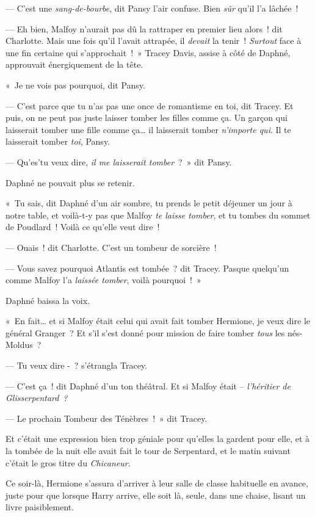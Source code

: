 --- C'est une \emph{sang-de-bourbe}, dit Pansy l'air confuse. Bien \emph{sûr} qu'il l'a lâchée~!

--- Eh bien, Malfoy n'aurait pas dû la rattraper en premier lieu alors~! dit Charlotte. Mais une fois qu'il l'avait attrapée, il \emph{devait} la tenir~! \emph{Surtout} face à une fin certaine qui s'approchait~!~» Tracey Davis, assise à côté de Daphné, approuvait énergiquement de la tête.

«~Je ne vois pas pourquoi, dit Pansy.

--- C'est parce que tu n'as pas une once de romantisme en toi, dit Tracey. Et puis, on ne peut pas juste laisser tomber les filles comme ça. Un garçon qui laisserait tomber une fille comme ça… il laisserait tomber \emph{n'importe qui}. Il te laisserait tomber \emph{toi}, Pansy.

--- Qu'es'tu veux dire, \emph{il me laisserait tomber}~?~» dit Pansy.

Daphné ne pouvait plus se retenir.

«~Tu sais, dit Daphné d'un air sombre, tu prends le petit déjeuner un jour à notre table, et voilà-t-y pas que Malfoy \emph{te laisse tomber}, et tu tombes du sommet de Poudlard~! Voilà ce qu'elle veut dire~!

--- Ouais~! dit Charlotte. C'est un tombeur de sorcière~!

--- Vous savez pourquoi Atlantis est tombée~? dit Tracey. Pasque quelqu'un comme Malfoy l'a \emph{laissée tomber}, voilà pourquoi~!~»

Daphné baissa la voix.

«~En fait… et si Malfoy était celui qui avait fait tomber Hermione, je veux dire le général Granger~? Et s'il s'est donné pour mission de faire tomber \emph{tous} les nés-Moldus~?

--- Tu veux dire -~? s'étrangla Tracey.

--- C'est ça~! dit Daphné d'un ton théâtral. Et si Malfoy était -- \emph{l'héritier de Glisserpentard~?}

--- Le prochain Tombeur des Ténèbres~!~» dit Tracey.

Et c'était une expression bien trop géniale pour qu'elles la gardent pour elle, et à la tombée de la nuit elle avait fait le tour de Serpentard, et le matin suivant c'était le gros titre du \emph{Chicaneur}.


Ce soir-là, Hermione s'assura d'arriver à leur salle de classe habituelle en avance, juste pour que lorsque Harry arrive, elle soit là, seule, dans une chaise, lisant un livre paisiblement.

